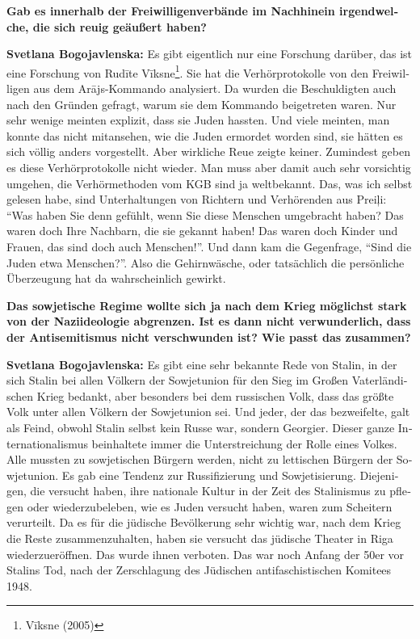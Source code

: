 \begin{otherlanguage}{ngerman}
\textbf{Gab es innerhalb der Freiwilligenverbände im Nachhinein irgendwelche, die sich reuig geäußert haben?}

\textbf{Svetlana Bogojavlenska:} Es gibt eigentlich nur eine Forschung darüber, das ist eine Forschung von Rudīte Vīksne\footnote{Vīksne (2005)}.  Sie hat die Verhörprotokolle von den Freiwilligen aus dem Arājs-Kommando analysiert. Da wurden die Beschuldigten auch nach den Gründen gefragt, warum sie dem Kommando beigetreten waren. Nur sehr wenige meinten explizit, dass sie Juden hassten. Und viele meinten, man konnte das nicht mitansehen, wie die Juden ermordet worden sind, sie hätten es sich völlig anders vorgestellt. Aber wirkliche Reue zeigte keiner. Zumindest geben es diese Verhörprotokolle nicht wieder. Man muss aber damit auch sehr vorsichtig umgehen, die Verhörmethoden vom KGB sind ja weltbekannt. Das, was ich selbst gelesen habe, sind Unterhaltungen von Richtern und Verhörenden aus Preiļi: "`Was haben Sie denn gefühlt, wenn Sie diese Menschen umgebracht haben? Das waren doch Ihre Nachbarn, die sie gekannt haben! Das waren doch Kinder und Frauen, das sind doch auch Menschen!"'. Und dann kam die Gegenfrage, "`Sind die Juden etwa Menschen?"'. Also die Gehirnwäsche, oder tatsächlich die persönliche Überzeugung hat da wahrscheinlich gewirkt.

\textbf{Das sowjetische Regime wollte sich ja nach dem Krieg möglichst stark von der Naziideologie abgrenzen. Ist es dann nicht verwunderlich, dass der Antisemitismus nicht verschwunden ist? Wie passt das zusammen?}

\textbf{Svetlana Bogojavlenska:} Es gibt eine sehr bekannte Rede von Stalin, in der sich Stalin bei allen Völkern der Sowjetunion für den Sieg im Großen Vaterländischen Krieg bedankt, aber besonders bei dem russischen Volk, dass das größte Volk unter allen Völkern der Sowjetunion sei. Und jeder, der das bezweifelte, galt als Feind, obwohl Stalin selbst kein Russe war, sondern Georgier. Dieser ganze Internationalismus beinhaltete immer die Unterstreichung der Rolle eines Volkes. Alle mussten zu sowjetischen Bürgern werden, nicht zu lettischen Bürgern der Sowjetunion. Es gab eine Tendenz zur Russifizierung und Sowjetisierung. Diejenigen, die versucht haben, ihre nationale Kultur in der Zeit des Stalinismus zu pflegen oder wiederzubeleben, wie es Juden versucht haben, waren zum Scheitern verurteilt. Da es für die jüdische Bevölkerung sehr wichtig war, nach dem Krieg die Reste zusammenzuhalten, haben sie versucht das jüdische Theater in Riga wiederzueröffnen. Das wurde ihnen verboten. 
Das war noch Anfang der 50er vor Stalins Tod, nach der Zerschlagung des Jüdischen antifaschistischen Komitees 1948.


\end{otherlanguage}
